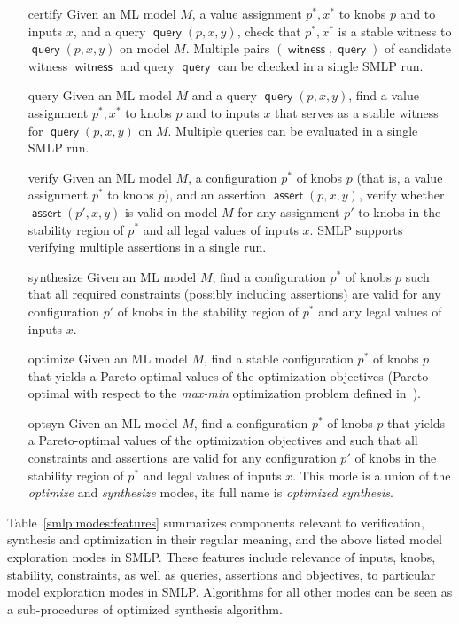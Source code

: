 \documentclass[a4paper,parskip=half]{article} %
\newcommand*\query{\operatorname{\mathsf{query}}}
\newcommand*\assert{\operatorname{\mathsf{assert}}}
\newcommand*\specval[1]{\operatorname{\mathsf{{#1}}}} %
\begin{document}
\begin{itemize}
\item[certify] Given an ML model $M$, a value assignment $p^*,x^*$ to knobs $p$ and to inputs $x$, and a query $\query(p,x,y)$,
check that $p^*,x^*$ is a stable witness to $\query(p,x,y)$ on model $M$. Multiple pairs $(\specval{witness},\query)$ 
of candidate witness $\specval{witness}$ and query $\query$ can be checked in a single SMLP run.
\item[query] Given an ML model $M$  and a query $\query(p,x,y)$, find a value assignment $p^*,x^*$ to knobs $p$ and to inputs $x$
that serves as a stable witness for $\query(p,x,y)$ on $M$. Multiple queries can be evaluated in a single SMLP run.
\item[verify] Given an ML model $M$,  a configuration $p^*$ of knobs $p$ (that is, a value assignment $p^*$ to knobs $p$),  
and an assertion $\assert(p,x,y)$, verify whether  
$\assert(p',x,y)$ is valid on model $M$ for any assignment $p'$ to knobs in the stability region of $p^*$ and all
legal values of inputs $x$.  SMLP supports verifying multiple assertions in a single run.
\item[synthesize] Given an ML model $M$,  find a configuration $p^*$ of knobs $p$
such that all required constraints (possibly including assertions)  are valid for any configuration $p'$ of knobs in the 
stability region of $p^*$  and any legal values of inputs $x$.
\item[optimize]  Given an ML model $M$,  find a stable configuration $p^*$ of knobs $p$ that yields a Pareto-optimal values of 
the optimization objectives (Pareto-optimal with respect to the \emph{max-min} optimization problem defined 
in~\cite{brausse2024smlp}).
\item[optsyn] Given an ML model $M$,  find a configuration $p^*$ of knobs $p$ that yields a Pareto-optimal values of the 
optimization objectives and such that all constraints and assertions are valid for any configuration $p'$ of knobs in the 
stability region of $p^*$  and legal values of inputs $x$. This mode is a union 
of the \emph{optimize} and \emph{synthesize} modes, its full name is \emph{optimized synthesis}. 

\end{itemize}


Table~\ref{smlp:modes:features} summarizes components relevant to verification, synthesis and optimization
in their regular meaning,  and the above listed model exploration modes in SMLP. These features include
relevance of inputs, knobs, stability, constraints, as well as  queries, assertions and objectives,
to particular model exploration modes in SMLP. 
Algorithms for all other modes can be seen as a sub-procedures of optimized synthesis algorithm.
\end{document}
